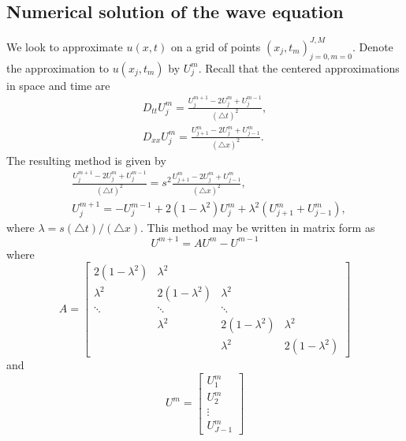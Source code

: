 \subsection*{Numerical solution of the wave equation}
We look to approximate $u(x,t)$ on a grid of points $(x_j,t_m)_{j=0,m=0}^{J,M}$.
Denote the approximation to $u(x_j,t_m)$ by $U_{j}^{m}$.
Recall that the centered approximations in space and time are
\begin{align*}
D_{tt} U_{j}^{m} = \frac{U_{j}^{m+1} -2 U_{j}^{m} + U_{j}^{m-1}}{(\triangle t)^2} ,\\
D_{xx} U_{j}^{m} = \frac{U_{j+1}^{m} -2 U_{j}^{m} + U_{j-1}^{m}}{(\triangle x)^2} .
\end{align*}
%
The resulting method is given by
\begin{align*}
	&\frac{U_{j}^{m+1} -2 U_{j}^{m} + U_{j}^{m-1}}{(\triangle t)^2} = s^2 \frac{U_{j+1}^{m} -2 U_{j}^{m} + U_{j-1}^{m}}{(\triangle x)^2}, \\
	&U_{j}^{m+1} =  - U_{j}^{m-1} + 2 (1-\lambda^2) U_{j}^{m} + \lambda ^2 (U_{j+1}^{m} + U_{j-1}^{m}),
\end{align*}
where $ \lambda  =  s(\triangle t)/(\triangle x)$.
This method may be written in matrix form as
\[U^{m+1} = AU^{m} - U^{m-1} \]
where
\[A =
\left[\begin{array}{cccc}2(1-\lambda^2) & \lambda^2 &  &  \\ \lambda^2 & 2(1-\lambda^2) & \lambda^2 &  \\ \ddots & \ddots & \ddots &  \\ & \lambda^2 & 2(1-\lambda^2) & \lambda^2 \\  &  & \lambda^2 & 2(1-\lambda^2)\end{array}\right]\]
and
\[U^m = \left[\begin{array}{c}U_{1}^{m} \\U_{2}^{m} \\\vdots \\U_{J-1}^{m}\end{array}\right]\]

